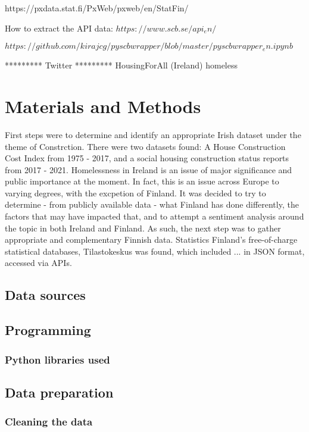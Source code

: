 \documentclass[hidelinks,12pt,oneside]{report} %
\begin{document}
https://pxdata.stat.fi/PxWeb/pxweb/en/StatFin/

How to extract the API data:
$https://www.scb.se/api_en/$

$https://github.com/kirajcg/pyscbwrapper/blob/master/pyscbwrapper_en.ipynb$

*********
Twitter
*********
HousingForAll (Ireland)
homeless



\chapter{Materials and Methods}

First steps were to determine and identify an appropriate Irish dataset under the theme of Constrction. There were two datasets found: A House Construction Cost Index from 1975 - 2017, and a social housing construction status reports from 2017 - 2021. Homelessness in Ireland is an issue of major significance and public importance at the moment. In fact, this is an issue across Europe to varying degrees, with the excpetion of Finland. It was decided to try to determine - from publicly available data - what Finland has done differently, the factors that may have impacted that, and to attempt a sentiment analysis around the topic in both Ireland and Finland. As such, the next step was to gather appropriate and complementary Finnish data. Statistics Finland’s free-of-charge statistical databases, Tilastokeskus was found, which included ... in JSON format, accessed via APIs.
 
\section{Data sources}

\section{Programming}


\subsection{Python libraries used}


\section{Data preparation}
\subsection{Cleaning the data}
\end{document}
